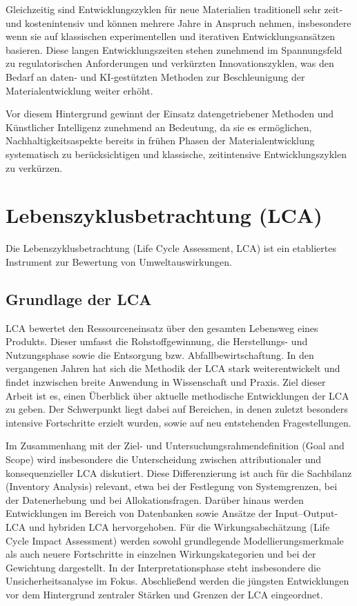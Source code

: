Gleichzeitig sind Entwicklungszyklen für neue Materialien traditionell sehr zeit‑ und kostenintensiv und können mehrere Jahre in Anspruch nehmen, insbesondere wenn sie auf klassischen experimentellen und iterativen Entwicklungsansätzen basieren. Diese langen Entwicklungszeiten stehen zunehmend im Spannungsfeld zu regulatorischen Anforderungen und verkürzten Innovationszyklen, was den Bedarf an daten‑ und KI‑gestützten Methoden zur Beschleunigung der Materialentwicklung weiter erhöht. \cite{jakobsen2025current}


Vor diesem Hintergrund gewinnt der Einsatz datengetriebener Methoden und Künstlicher Intelligenz zunehmend an Bedeutung, da sie es ermöglichen, Nachhaltigkeitsaspekte bereits in frühen Phasen der Materialentwicklung systematisch zu berücksichtigen und klassische, zeitintensive Entwicklungszyklen zu verkürzen. 


\cite{akafuah2016evolution}
\cite{tisza2013advanced}


\section{Lebenszyklusbetrachtung (LCA)}

Die Lebenszyklusbetrachtung (Life Cycle Assessment, LCA) ist ein etabliertes Instrument zur Bewertung von Umweltauswirkungen. \cite{ilgin2010environmentally}





\subsection{Grundlage der LCA}

 LCA bewertet den Ressourceneinsatz über den gesamten Lebensweg eines Produkts. Dieser umfasst die Rohstoffgewinnung, die Herstellungs- und Nutzungsphase sowie die Entsorgung bzw. Abfallbewirtschaftung. In den vergangenen Jahren hat sich die Methodik der LCA stark weiterentwickelt und findet inzwischen breite Anwendung in Wissenschaft und Praxis. Ziel dieser Arbeit ist es, einen Überblick über aktuelle methodische Entwicklungen der LCA zu geben. Der Schwerpunkt liegt dabei auf Bereichen, in denen zuletzt besonders intensive Fortschritte erzielt wurden, sowie auf neu entstehenden Fragestellungen. \cite{finnveden2009recent}

Im Zusammenhang mit der Ziel- und Untersuchungsrahmendefinition (Goal and Scope) wird insbesondere die Unterscheidung zwischen attributionaler und konsequenzieller LCA diskutiert. Diese Differenzierung ist auch für die Sachbilanz (Inventory Analysis) relevant, etwa bei der Festlegung von Systemgrenzen, bei der Datenerhebung und bei Allokationsfragen. Darüber hinaus werden Entwicklungen im Bereich von Datenbanken sowie Ansätze der Input–Output-LCA und hybriden LCA hervorgehoben. Für die Wirkungsabschätzung (Life Cycle Impact Assessment) werden sowohl grundlegende Modellierungsmerkmale als auch neuere Fortschritte in einzelnen Wirkungskategorien und bei der Gewichtung dargestellt. In der Interpretationsphase steht insbesondere die Unsicherheitsanalyse im Fokus. Abschließend werden die jüngsten Entwicklungen vor dem Hintergrund zentraler Stärken und Grenzen der LCA eingeordnet. \cite{hauschild2018life}

